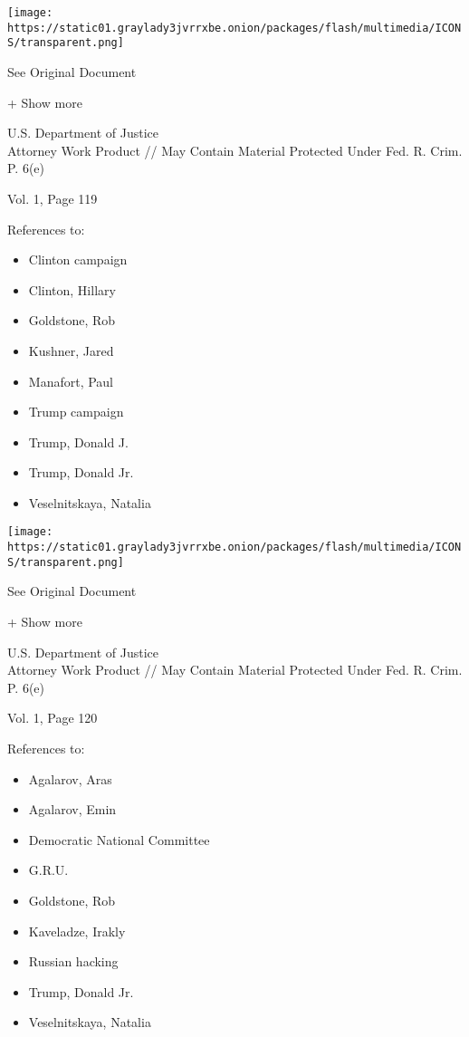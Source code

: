 \protect\hyperlink{}{}

\texttt{[image: https://static01.graylady3jvrrxbe.onion/packages/flash/multimedia/ICONS/transparent.png]}

See Original Document

+ Show more

U.S. Department of Justice\\
Attorney Work Product // May Contain Material Protected Under Fed. R.
Crim. P. 6(e)

Vol. 1, Page 119

References to:

\begin{itemize}
\tightlist
\item
  Clinton campaign
\item
  Clinton, Hillary
\item
  Goldstone, Rob
\item
  Kushner, Jared
\item
  Manafort, Paul 
\item
  Trump campaign
\item
  Trump, Donald J.
\item
  Trump, Donald Jr.
\item
  Veselnitskaya, Natalia
\end{itemize}

\protect\hyperlink{}{}

\texttt{[image: https://static01.graylady3jvrrxbe.onion/packages/flash/multimedia/ICONS/transparent.png]}

See Original Document

+ Show more

U.S. Department of Justice\\
Attorney Work Product // May Contain Material Protected Under Fed. R.
Crim. P. 6(e)

Vol. 1, Page 120

References to:

\begin{itemize}
\tightlist
\item
  Agalarov, Aras
\item
  Agalarov, Emin
\item
  Democratic National Committee
\item
  G.R.U.
\item
  Goldstone, Rob
\item
  Kaveladze, Irakly
\item
  Russian hacking
\item
  Trump, Donald Jr.
\item
  Veselnitskaya, Natalia
\end{itemize}

